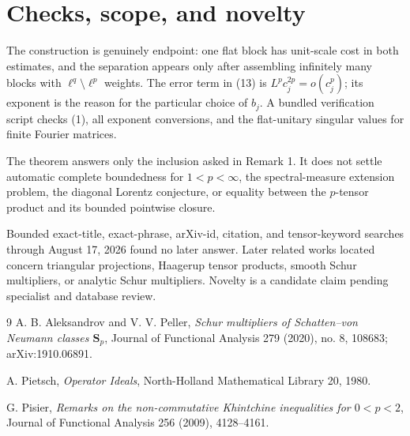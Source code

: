 \documentclass[11pt]{article}
\theoremstyle{remark}
\begin{document}
\section{Checks, scope, and novelty}

The construction is genuinely endpoint: one flat block has unit-scale cost
in both estimates, and the separation appears only after assembling infinitely
many blocks with \(\ell^q\setminus\ell^p\) weights. The error term in (13) is
\(L^pc_j^{2p}=o(c_j^p)\); its exponent is the reason for the particular choice
of \(b_j\). A bundled verification script checks (1), all exponent conversions,
and the flat-unitary singular values for finite Fourier matrices.

The theorem answers only the inclusion asked in Remark 1. It does not settle
automatic complete boundedness for \(1<p<\infty\), the spectral-measure
extension problem, the diagonal Lorentz conjecture, or equality between the
\(p\)-tensor product and its bounded pointwise closure.

Bounded exact-title, exact-phrase, arXiv-id, citation, and tensor-keyword
searches through August 17, 2026 found no later answer. Later related works
located concern triangular projections, Haagerup tensor products, smooth
Schur multipliers, or analytic Schur multipliers. Novelty is a candidate claim
pending specialist and database review.

\begin{thebibliography}{9}
A. B. Aleksandrov and V. V. Peller,
\emph{Schur multipliers of Schatten--von Neumann classes
\(\boldsymbol S_p\)},
Journal of Functional Analysis 279 (2020), no. 8, 108683;
arXiv:1910.06891.

A. Pietsch,
\emph{Operator Ideals},
North-Holland Mathematical Library 20, 1980.

G. Pisier,
\emph{Remarks on the non-commutative Khintchine inequalities for
\(0<p<2\)},
Journal of Functional Analysis 256 (2009), 4128--4161.
\end{thebibliography}
\end{document}
